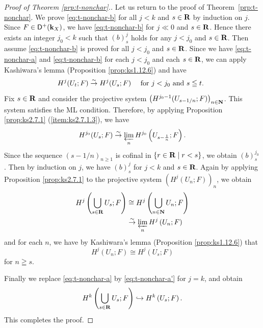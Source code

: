 \begin{proof}[{Proof of Theorem \ref{prp:t-nonchar}.}]
  Let us return to the proof of 
  Theorem~\ref{prp:t-nonchar}. 
  We prove \ref{eq:t-nonchar-b} for 
  all \(j<k\) and \(s\in\rr\) by induction on \(j\). 
  Since \(F\in\Dompl(\kk_X)\), 
  we have \ref{eq:t-nonchar-b} for \(j\ll 0\) and \(s\in\rr\). 
  Hence there exists an integer \(j_{0}<k\) 
  such that \((b)_{s}^{j}\) holds 
  for any \(j<j_{0}\) and \(s\in\rr\).  
  Then assume \ref{eq:t-nonchar-b} is proved for 
  all \(j< j_{0}\) and \(s\in\rr\). 
  Since we have \ref{eq:t-nonchar-a} and \ref{eq:t-nonchar-b} 
  for each \(j< j_{0}\) and each \(s\in\rr\), 
  we can apply 
  Kashiwara's lemma (Proposition \ref{prop:ks1.12.6}) 
  and have\[
    H^{j}(U_{t};F)\simar H^{j}(U_{s};F) 
    \quad
    \text{ for \(j< j_{0}\) and \(s\leqq t\). }
  \]
  Fix \(s\in\rr\) and consider the projective system \(
    \left(H^{j_{0}-1}(U_{s-1/n};F)\right)_{n\in\nn}
  \). This system satisfies the ML condition.  
  Therefore, by applying 
  Proposition \ref{prop:ks2.7.1} (\ref{item:ks2.7.1.3}), 
  we have \[
    H^{j_{0}}(U_{s};F)
    \simar 
    \prolim[n]H^{j_{0}}\left(U_{s-\frac{1}{n}};F\right). 
  \]
  Since the sequence \((s-1/n)_{n\geq 1}\)
  is cofinal in \(\{r\in\rr\mid r<s\}\),
  we obtain \((b)_s^{j_0}\).
  Then by induction on \(j\), 
  we have \((b)_{s}^{j}\) for \(j<k\) and \(s\in\rr\). 
  Again by applying Proposition \ref{prop:ks2.7.1} to the 
  projective system \(\left(H^{j}(U_{n};F)\right)_{n}\), 
  we obtain 
  \begin{align*}
    H^{j}\left(\bigcup_{s\in\rr}U_{s};F\right)
    &\cong
    H^{j}\left(\bigcup_{n\in\nn}U_{n};F\right)\\
    &\simar 
    \prolim[n]H^{j}\left(U_{n};F\right)
  \end{align*}
  and for each \(n\), we have by Kashiwara's lemma 
  (Proposition \ref{prop:ks1.12.6}) that
  \[
    H^{j}\left(U_{n};F\right)
    \cong
    H^{j}(U_{s};F)
  \]
  for \(n\geqq s\).

  Finally we replace \ref{eq:t-nonchar-a} by 
  \ref{eq:t-nonchar-a'} for \(j=k\), and obtain
  \[
    H^{k}\left(\bigcup_{s\in\rr}U_{s};F\right)
    \hookrightarrow
    H^{k}\left(U_{s};F\right).
  \]
  This completes the proof. 
\end{proof}

